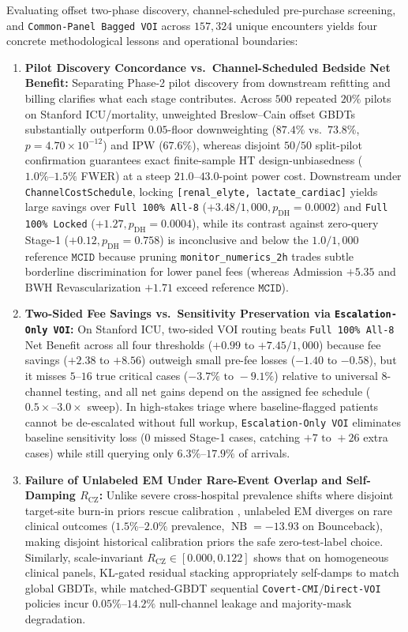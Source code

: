 \documentclass[11pt]{article}
\theoremstyle{remark}
\begin{document}
Evaluating offset two-phase discovery, channel-scheduled pre-purchase screening, and \texttt{Common-Panel Bagged VOI} across $157{,}324$ unique encounters yields four concrete methodological lessons and operational boundaries:
\begin{enumerate}
  \item \textbf{Pilot Discovery Concordance vs.\ Channel-Scheduled Bedside Net Benefit:} Separating Phase-2 pilot discovery from downstream refitting and billing clarifies what each stage contributes. Across $500$ repeated $20\%$ pilots on Stanford ICU/mortality, unweighted Breslow--Cain offset GBDTs substantially outperform $0.05$-floor downweighting ($87.4\%$ vs.\ $73.8\%$, $p=4.70\times 10^{-12}$) and IPW ($67.6\%$), whereas disjoint $50/50$ split-pilot confirmation guarantees exact finite-sample HT design-unbiasedness ($1.0\%\text{--}1.5\%$ FWER) at a steep $21.0\text{--}43.0$-point power cost. Downstream under \texttt{ChannelCostSchedule}, locking \texttt{[renal\_elyte, lactate\_cardiac]} yields large savings over \texttt{Full 100\% All-8} ($+3.48/1{,}000, p_{\text{DH}}=0.0002$) and \texttt{Full 100\% Locked} ($+1.27, p_{\text{DH}}=0.0004$), while its contrast against zero-query Stage-1 ($+0.12, p_{\text{DH}}=0.758$) is inconclusive and below the $1.0/1{,}000$ reference $\texttt{MCID}$ because pruning \texttt{monitor\_numerics\_2h} trades subtle borderline discrimination for lower panel fees (whereas Admission $+5.35$ and BWH Revascularization $+1.71$ exceed reference $\texttt{MCID}$).
  \item \textbf{Two-Sided Fee Savings vs.\ Sensitivity Preservation via \texttt{Escalation-Only VOI}:} On Stanford ICU, two-sided VOI routing beats \texttt{Full 100\% All-8} Net Benefit across all four thresholds ($+0.99$ to $+7.45/1{,}000$) because fee savings ($+2.38$ to $+8.56$) outweigh small pre-fee losses ($-1.40$ to $-0.58$), but it misses $5\text{--}16$ true critical cases ($-3.7\%\text{ to }-9.1\%$) relative to universal $8$-channel testing, and all net gains depend on the assigned fee schedule ($0.5\times\text{--}3.0\times$ sweep). In high-stakes triage where baseline-flagged patients cannot be de-escalated without full workup, \texttt{Escalation-Only VOI} eliminates baseline sensitivity loss ($0$ missed Stage-1 cases, catching $+7\text{ to }+26$ extra cases) while still querying only $6.3\%\text{--}17.9\%$ of arrivals.
  \item \textbf{Failure of Unlabeled EM Under Rare-Event Overlap and Self-Damping $R_{\text{CZ}}$:} Unlike severe cross-hospital prevalence shifts where disjoint target-site burn-in priors rescue calibration \citep{satz2026collision}, unlabeled \citet{saerens2002adjusting} EM diverges on rare clinical outcomes ($1.5\%\text{--}2.0\%$ prevalence, $\operatorname{NB}=-13.93$ on Bounceback), making disjoint historical calibration priors the safe zero-test-label choice. Similarly, scale-invariant $R_{\text{CZ}} \in [0.000, 0.122]$ shows that on homogeneous clinical panels, KL-gated residual stacking appropriately self-damps to match global GBDTs, while matched-GBDT sequential \texttt{Covert-CMI}/\texttt{Direct-VOI} policies incur $0.05\%\text{--}14.2\%$ null-channel leakage and majority-mask degradation.

\end{enumerate}
\end{document}
